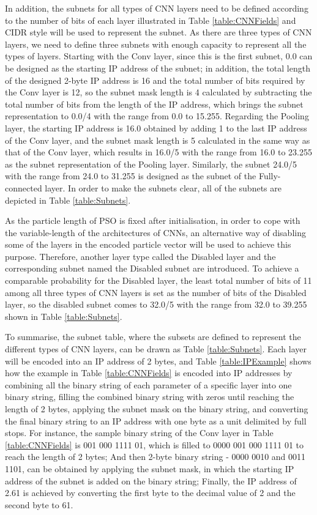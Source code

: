 \documentclass[conference]{IEEEtran}
\begin{document}
In addition, the subnets for all types of CNN layers need to be defined according to the number of bits of each layer illustrated in Table \ref{table:CNNFields} and CIDR style will be used to represent the subnet. As there are three types of CNN layers, we need to define three subnets with enough capacity to represent all the types of layers. Starting with the Conv layer, since this is the first subnet, 0.0 can be designed as the starting IP address of the subnet; in addition, the total length of the designed 2-byte IP address is 16 and the total number of bits required by the Conv layer is 12, so the subnet mask length is 4 calculated by subtracting the total number of bits from the length of the IP address, which brings the subnet representation to 0.0/4 with the range from 0.0 to 15.255. Regarding the Pooling layer, the starting IP address is 16.0 obtained by adding 1 to the last IP address of the Conv layer, and the subnet mask length is 5 calculated in the same way as that of the Conv layer, which results in 16.0/5 with the range from 16.0 to 23.255 as the subnet representation of the Pooling layer. Similarly, the subnet 24.0/5 with the range from 24.0 to 31.255 is designed as the subnet of the Fully-connected layer. In order to make the subnets clear, all of the subnets are depicted in Table \ref{table:Subnets}. 


As the particle length of PSO is fixed after initialisation, in order to cope with the variable-length of the architectures of CNNs, an alternative way of disabling some of the layers in the encoded particle vector will be used to achieve this purpose. Therefore, another layer type called the Disabled layer and the corresponding subnet named the Disabled subnet are introduced. To achieve a comparable probability for the Disabled layer, the least total number of bits of 11 among all three types of CNN layers is set as the number of bits of the Disabled layer, so the disabled subnet comes to 32.0/5 with the range from 32.0 to 39.255 shown in Table \ref{table:Subnets}. 


To summarise, the subnet table, where the subsets are defined to represent the different types of CNN layers, can be drawn as Table \ref{table:Subnets}. Each layer will be encoded into an IP address of 2 bytes, and Table \ref{table:IPExample} shows how the example in Table \ref{table:CNNFields} is encoded into IP addresses by combining all the binary string of each parameter of a specific layer into one binary string, filling the combined binary string with zeros until reaching the length of 2 bytes, applying the subnet mask on the binary string, and converting the final binary string to an IP address with one byte as a unit delimited by full stops. For instance, the sample binary string of the Conv layer in Table \ref{table:CNNFields} is 001 000 1111 01, which is filled to 0000 001 000 1111 01 to reach the length of 2 bytes; And then 2-byte binary string - 0000 0010 and 0011 1101, can be obtained by applying the subnet mask, in which the starting IP address of the subnet is added on the binary string; Finally, the IP address of 2.61 is achieved by converting the first byte to the decimal value of 2 and the second byte to 61. 
\end{document}
